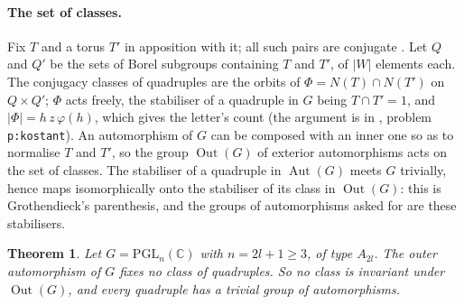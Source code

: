 \documentclass[11pt,a4paper]{amsart}
\newtheorem{theorem}{Theorem}[section]
\theoremstyle{definition}
\theoremstyle{remark}
\newcommand{\PGL}{\mathrm{PGL}}
\newcommand{\C}{\mathbb C}
\begin{document}
\paragraph{The set of classes.} Fix $T$ and a torus $T'$ in apposition with it; all such pairs are conjugate \cite[Thm~7.3]{kostant}. Let $Q$ and $Q'$ be the sets of Borel subgroups containing $T$ and $T'$, of $|W|$ elements each. The conjugacy classes of quadruples are the orbits of $\Phi = N(T)\cap N(T')$ on $Q \times Q'$; $\Phi$ acts freely, the stabiliser of a quadruple in $G$ being $T \cap T' = 1$, and $|\Phi| = h\,z\,\varphi(h)$, which gives the letter's count (the argument is in \cite{problems}, problem \texttt{p:kostant}). An automorphism of $G$ can be composed with an inner one so as to normalise $T$ and $T'$, so the group $\operatorname{Out}(G)$ of exterior automorphisms acts on the set of classes. The stabiliser of a quadruple in $\operatorname{Aut}(G)$ meets $G$ trivially, hence maps isomorphically onto the stabiliser of its class in $\operatorname{Out}(G)$: this is Grothendieck's parenthesis, and the groups of automorphisms asked for are these stabilisers.

\begin{theorem}\label{thm:odd}
Let $G = \PGL_n(\C)$ with $n = 2l+1 \ge 3$, of type $A_{2l}$. The outer automorphism of $G$ fixes no class of quadruples. So no class is invariant under $\operatorname{Out}(G)$, and every quadruple has a trivial group of automorphisms.
\end{theorem}
\end{document}
